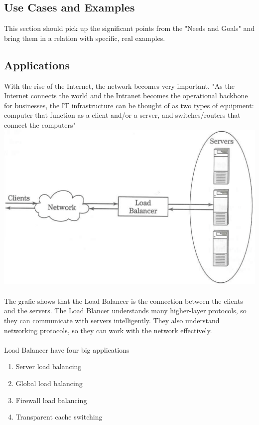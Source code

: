 \documentclass[12p]{article}
\begin{document}
	\newpage	
	\subsection{Use Cases and Examples}
	This section should pick up the significant points from the "Needs and Goals" and bring them in a relation with specific, real examples.
	
	\subsection{Applications}
	With the rise of the Internet, the network becomes very important. "As the Internet connects the world and the Intranet becomes the operational backbone for businesses, the IT infrastructure can be thought of as two types of equipment: computer that function as a client and/or a server, and switches/routers that connect the computers"\cite{lb_SFC} \\
	\includegraphics[width=\textwidth]{basic}\cite{lb_SFC} \\\\
	The grafic shows that the Load Balancer is the connection between the clients and the servers. The Load Blancer understands many higher-layer protocols, so they can communicate with servers intelligently. They also understand networking protocols, so they can work with the network effectively.\\\\
	Load Balancer have four big applications
	\begin{enumerate}
		\item Server load balancing
		\item Global load balancing
		\item Firewall load balancing
		\item Transparent cache switching
	\end{enumerate}
\end{document}

